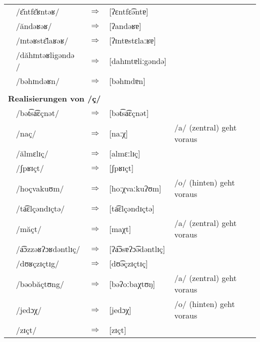 \begin{longtable}[l]{p{0.1mm}lcll}
    & /ɛ̆ntfɛ̆ʁntəʁ/       & $\Rightarrow$ & [ʔɛntfɛ͡əntɐ]        &                                   \\
    & /ăndəʁəʁ/          & $\Rightarrow$ & [ʔandəʁɐ]           &                                   \\
    & /ɪntəʁstɛ̆laʁəʁ/    & $\Rightarrow$ & [ʔɪntɐstɛlaːʁɐ]     &                                   \\
    & /dăhɪntəʁligəndə / & $\Rightarrow$ & [dahɪntɐliːgəndə]   &                                   \\
    & /bəhɪndəʁn/        & $\Rightarrow$ & [bəhɪndɐn]          &                                   \\
  \multicolumn{5}{l}{ }                                                                            \\
  \multicolumn{5}{l}{\textbf{Realisierungen von /ç/}}                                              \\
    & /bət͡sa͡ɛçnət/       & $\Rightarrow$ & [bət͡sa͡ɛçnət]        &                                   \\
    & /naç/              & $\Rightarrow$ & [naːχ]              & /a/ (zentral) geht voraus         \\
    & /ălmɛlɪç/          & $\Rightarrow$ & [almɛːlɪç]          &                                   \\
    & /ʃpʁɪçt/           & $\Rightarrow$ & [ʃpʁɪçt]            &                                   \\
    & /hoçvakuʊm/        & $\Rightarrow$ & [hoːχvaːkuʔʊm]      & /o/ (hinten) geht voraus          \\
    & /ta͡ɛlçəndɪçtə/     & $\Rightarrow$ & [ta͡ɛlçəndɪçtə]      &                                   \\
    & /măçt/             & $\Rightarrow$ & [maχt]              & /a/ (zentral) geht voraus         \\
    & /a͡ɔzzəʁʔɔʁdəntlɪç/ & $\Rightarrow$ & [ʔa͡ɔsɐʔɔ͡ədəntlɪç]   &                                   \\
    & /dʊʁçzɪçtɪg/       & $\Rightarrow$ & [dʊ͡əçzɪçtɪç]        &                                   \\
    & /bəobăçtʊng/       & $\Rightarrow$ & [bəʔoːbaχtʊŋ]       & /a/ (zentral) geht voraus         \\
    & /jedɔχ/            & $\Rightarrow$ & [jedɔχ]             & /o/ (hinten) geht voraus          \\
    & /zɪçt/             & $\Rightarrow$ & [zɪçt]              &                                   \\

\end{longtable}
